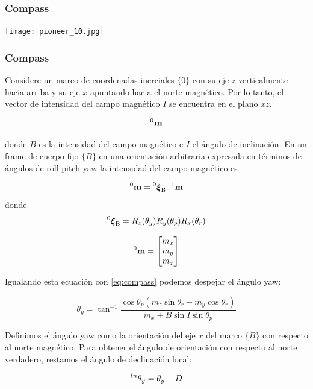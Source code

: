 \begin{frame}
    \frametitle{Compass}

    \begin{center}
        \texttt{[image: pioneer\_10.jpg]}
    \end{center}
\end{frame}


\begin{frame}
    \frametitle{Compass}
    \footnotesize
    Considere un marco de coordenadas inerciales $\{ 0 \}$ con su eje $z$ verticalmente hacia arriba y su eje $x$ apuntando hacia el norte magnético. Por lo tanto, el vector de intensidad del campo magnético $I$ se encuentra en el plano $xz$.

    \begin{equation*}
        \toCoord{\vec{m}}{0}
    \end{equation*}

    donde $B$ es la intensidad del campo magnético e $I$ el ángulo de inclinación. En un frame de cuerpo fijo $\{ B \}$ en una orientación arbitraria expresada en términos de ángulos de roll-pitch-yaw la intensidad del campo magnético es

    \begin{equation}
        \label{eq:compass}
        \toCoord{\vec{m}}{0} = \transform{0}{B}^{-1} \vec{m}
    \end{equation}
    donde
    \begin{equation*}
        \transform{0}{B} = R_{z}(\theta_{y}) R_{y}(\theta_{p}) R_{x}(\theta_{r})
    \end{equation*}

    \begin{equation*}
    \toCoord{\vec{m}}{0} =
    \begin{bmatrix}
        m_{x} \\
        m_{y} \\
        m_{z}
    \end{bmatrix}
    \end{equation*}

    Igualando esta ecuación con \ref{eq:compass} podemos despejar el ángulo yaw:

    \begin{equation*}
        \theta_{y} = \tan^{-1} \dfrac{\cos \theta_{p}  \left( m_{z} \sin \theta_{r} - m_{y} \cos \theta_{r} \right)} {m_{x} + B \sin I \sin \theta_{p}}
    \end{equation*}

    Definimos el ángulo yaw como la orientación del eje $x$ del marco $\{ B \}$ con respecto al norte magnético. Para obtener el ángulo de orientación con respecto al norte verdadero, restamos el ángulo de declinación local:

    \begin{equation*}
        \prescript{tn}{}{\theta_{y}} = \theta_{y} - D
    \end{equation*}

\end{frame}
